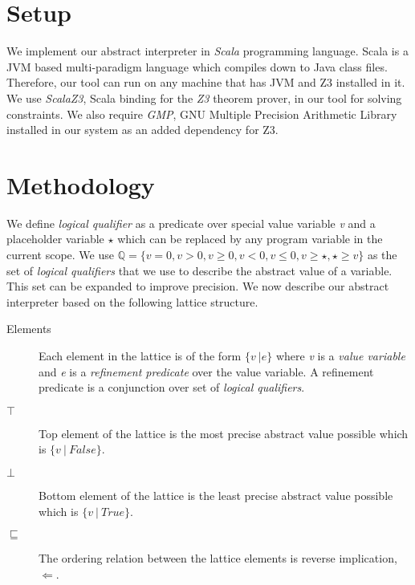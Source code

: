 \documentclass[9pt]{article}
\begin{document}
\section{Setup}
We implement our abstract interpreter in \textit{Scala} programming language. Scala is a JVM based multi-paradigm language which compiles down to Java class files. Therefore, our tool can run on any machine that has JVM and Z3 installed in it. We use \textit{ScalaZ3}\cite{ScalaZ3}, Scala binding for the \textit{Z3} theorem prover, in our tool for solving constraints. We also require \textit{GMP}, GNU Multiple Precision Arithmetic Library installed in our system as an added dependency for Z3.

\section{Methodology}
We define \textit{logical qualifier} as a predicate over special value variable \textit{v} and a placeholder variable \ensuremath{\star} which can be replaced by any program variable in the current scope. We use \ensuremath{\mathbb{Q} = \{v = 0, v > 0, v \geq 0, v < 0, v \leq 0, v \geq \star, \star \geq v\}} as the set of \textit{logical qualifiers} that we use to describe the abstract value of a variable. This set can be expanded to improve precision. We now describe our abstract interpreter based on the following lattice structure.
\begin{description}
\item[Elements]
Each element in the lattice is of the form \ensuremath{\{v\ | e\}} where \textit{v} is a \textit{value variable} and \textit{e} is a \textit{refinement predicate} over the value variable. A refinement predicate is a conjunction over set of \textit{logical qualifiers}.
\item[\ensuremath{\top}] 
Top element of the lattice is the most precise abstract value possible which is \ensuremath{\{v\ |\ False\}}.
\item[\ensuremath{\bot}]
Bottom element of the lattice is the least precise abstract value possible which is \ensuremath{\{v\ |\ True\}}.
\item[\ensuremath{\sqsubseteq}]
The ordering relation between the lattice elements is reverse implication, \ensuremath{\Leftarrow}. 
\end{description}
\end{document}
